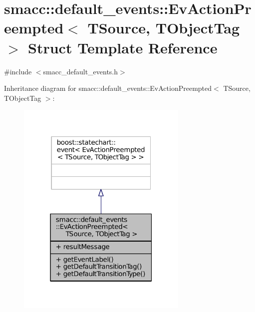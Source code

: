\hypertarget{structsmacc_1_1default__events_1_1EvActionPreempted}{}\section{smacc\+:\+:default\+\_\+events\+:\+:Ev\+Action\+Preempted$<$ T\+Source, T\+Object\+Tag $>$ Struct Template Reference}
\label{structsmacc_1_1default__events_1_1EvActionPreempted}


{\ttfamily \#include $<$smacc\+\_\+default\+\_\+events.\+h$>$}



Inheritance diagram for smacc\+:\+:default\+\_\+events\+:\+:Ev\+Action\+Preempted$<$ T\+Source, T\+Object\+Tag $>$\+:
\nopagebreak
\begin{figure}[H]
\begin{center}
\leavevmode
\includegraphics[width=232pt]{structsmacc_1_1default__events_1_1EvActionPreempted__inherit__graph}
\end{center}
\end{figure}


